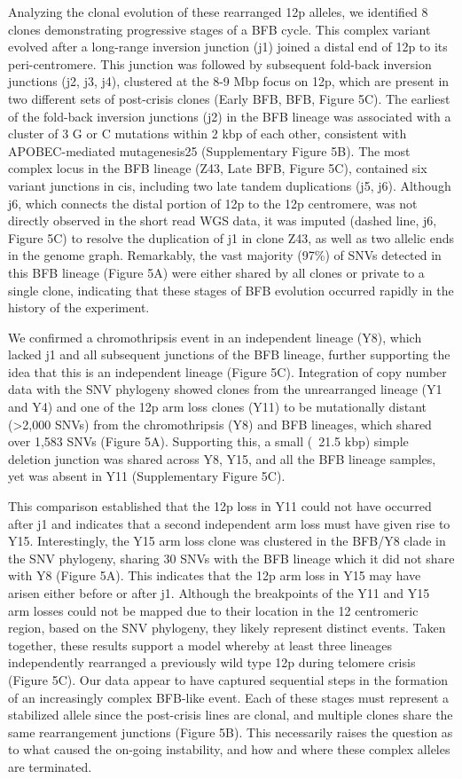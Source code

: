 \documentclass[phd,tocprelim]{cornell}
\begin{document}
Analyzing the clonal evolution of these rearranged 12p alleles, we identified 8 clones demonstrating progressive stages of a BFB cycle. This complex variant evolved after a long-range inversion junction (j1) joined a distal end of 12p to its peri-centromere. This junction was followed by subsequent fold-back inversion junctions (j2, j3, j4), clustered at the 8-9 Mbp focus on 12p, which are present in two different sets of post-crisis clones (Early BFB, BFB, Figure 5C). The earliest of the fold-back inversion junctions (j2) in the BFB lineage was associated with a cluster of 3 G or C mutations within 2 kbp of each other, consistent with APOBEC-mediated mutagenesis25 (Supplementary Figure 5B). The most complex locus in the BFB lineage (Z43, Late BFB, Figure 5C), contained six variant junctions in cis, including two late tandem duplications (j5, j6). Although j6, which connects the distal portion of 12p to the 12p centromere, was not directly observed in the short read WGS data, it was imputed (dashed line, j6, Figure 5C) to resolve the duplication of j1 in clone Z43, as well as two allelic ends in the genome graph. Remarkably, the vast majority (97\%) of SNVs detected in this BFB lineage (Figure 5A) were either shared by all clones or private to a single clone, indicating that these stages of BFB evolution occurred rapidly in the history of the experiment.

We confirmed a chromothripsis event in an independent lineage (Y8), which lacked j1 and all subsequent junctions of the BFB lineage, further supporting the idea that this is an independent lineage (Figure 5C). Integration of copy number data with the SNV phylogeny showed clones from the unrearranged lineage (Y1 and Y4) and one of the 12p arm loss clones (Y11) to be mutationally distant (>2,000 SNVs) from the chromothripsis (Y8) and BFB lineages, which shared over 1,583 SNVs (Figure 5A). Supporting this, a small (~21.5 kbp) simple deletion junction was shared across Y8, Y15, and all the BFB lineage samples, yet was absent in Y11 (Supplementary Figure 5C).  

This comparison established that the 12p loss in Y11 could not have occurred after j1 and indicates that a second independent arm loss must have given rise to Y15. Interestingly, the Y15 arm loss clone was clustered in the BFB/Y8 clade in the SNV phylogeny, sharing 30 SNVs with the BFB lineage which it did not share with Y8 (Figure 5A). This indicates that the 12p arm loss in Y15 may have arisen either before or after j1. Although the breakpoints of the Y11 and Y15 arm losses could not be mapped due to their location in the 12 centromeric region, based on the SNV phylogeny, they likely represent distinct events. Taken together, these results support a model whereby at least three lineages independently rearranged a previously wild type 12p during telomere crisis (Figure 5C). Our data appear to have captured sequential steps in the formation of an increasingly complex BFB-like event. Each of these stages must represent a stabilized allele since the post-crisis lines are clonal, and multiple clones share the same rearrangement junctions (Figure 5B). This necessarily raises the question as to what caused the on-going instability, and how and where these complex alleles are terminated.
\end{document}
